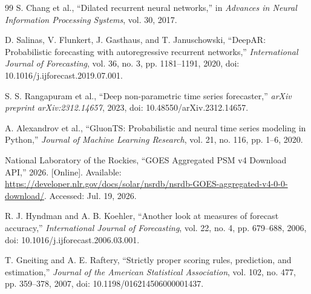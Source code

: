 \documentclass[10pt,conference,a4paper]{IEEEtran}
\begin{document}
\begin{thebibliography}{99}
S. Chang et al., ``Dilated recurrent neural networks,'' in
\textit{Advances in Neural Information Processing Systems}, vol. 30, 2017.

D. Salinas, V. Flunkert, J. Gasthaus, and T. Januschowski, ``DeepAR:
Probabilistic forecasting with autoregressive recurrent networks,''
\textit{International Journal of Forecasting}, vol. 36, no. 3,
pp. 1181--1191, 2020, doi: 10.1016/j.ijforecast.2019.07.001.

S. S. Rangapuram et al., ``Deep non-parametric time series forecaster,''
\textit{arXiv preprint arXiv:2312.14657}, 2023,
doi: 10.48550/arXiv.2312.14657.

A. Alexandrov et al., ``GluonTS: Probabilistic and neural time series modeling
in Python,'' \textit{Journal of Machine Learning Research}, vol. 21, no. 116,
pp. 1--6, 2020.

National Laboratory of the Rockies, ``GOES Aggregated PSM v4 Download API,''
2026. [Online]. Available:
\url{https://developer.nlr.gov/docs/solar/nsrdb/nsrdb-GOES-aggregated-v4-0-0-download/}.
Accessed: Jul. 19, 2026.

R. J. Hyndman and A. B. Koehler, ``Another look at measures of forecast
accuracy,'' \textit{International Journal of Forecasting}, vol. 22, no. 4,
pp. 679--688, 2006, doi: 10.1016/j.ijforecast.2006.03.001.

T. Gneiting and A. E. Raftery, ``Strictly proper scoring rules, prediction, and
estimation,'' \textit{Journal of the American Statistical Association},
vol. 102, no. 477, pp. 359--378, 2007,
doi: 10.1198/016214506000001437.

\end{thebibliography}
\end{document}
